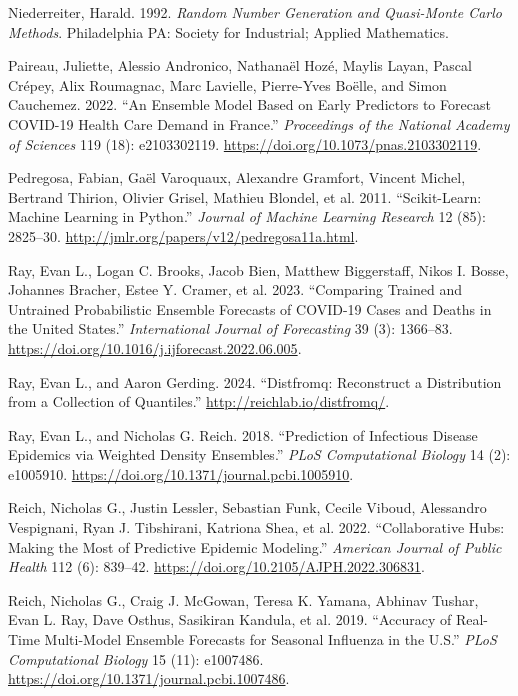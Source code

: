 \documentclass[
]{article}
\newlength{\cslhangindent}
\newenvironment{CSLReferences}[2] %
 {\begin{list}{}{%
  \setlength{\itemindent}{0pt}
  \setlength{\leftmargin}{0pt}
  \setlength{\parsep}{0pt}
  \ifodd #1
   \setlength{\leftmargin}{\cslhangindent}
   \setlength{\itemindent}{-1\cslhangindent}
  \fi
  \setlength{\itemsep}{#2\baselineskip}}}
 {\end{list}}
\begin{document}
\begin{CSLReferences}{1}{0}
Niederreiter, Harald. 1992. \emph{Random Number Generation and
Quasi-Monte Carlo Methods}. Philadelphia PA: Society for Industrial;
Applied Mathematics.

Paireau, Juliette, Alessio Andronico, Nathanaël Hozé, Maylis Layan,
Pascal Crépey, Alix Roumagnac, Marc Lavielle, Pierre-Yves Boëlle, and
Simon Cauchemez. 2022. {``An Ensemble Model Based on Early Predictors to
Forecast {COVID}-19 Health Care Demand in {France}.''} \emph{Proceedings
of the National Academy of Sciences} 119 (18): e2103302119.
\url{https://doi.org/10.1073/pnas.2103302119}.

Pedregosa, Fabian, Gaël Varoquaux, Alexandre Gramfort, Vincent Michel,
Bertrand Thirion, Olivier Grisel, Mathieu Blondel, et al. 2011.
{``Scikit-Learn: {Machine} {Learning} in {Python}.''} \emph{Journal of
Machine Learning Research} 12 (85): 2825--30.
\url{http://jmlr.org/papers/v12/pedregosa11a.html}.

Ray, Evan L., Logan C. Brooks, Jacob Bien, Matthew Biggerstaff, Nikos I.
Bosse, Johannes Bracher, Estee Y. Cramer, et al. 2023. {``Comparing
Trained and Untrained Probabilistic Ensemble Forecasts of {COVID}-19
Cases and Deaths in the {United} {States}.''} \emph{International
Journal of Forecasting} 39 (3): 1366--83.
\url{https://doi.org/10.1016/j.ijforecast.2022.06.005}.

Ray, Evan L., and Aaron Gerding. 2024. {``Distfromq: Reconstruct a
Distribution from a Collection of Quantiles.''}
\url{http://reichlab.io/distfromq/}.

Ray, Evan L., and Nicholas G. Reich. 2018. {``Prediction of Infectious
Disease Epidemics via Weighted Density Ensembles.''} \emph{PLoS
Computational Biology} 14 (2): e1005910.
\url{https://doi.org/10.1371/journal.pcbi.1005910}.

Reich, Nicholas G., Justin Lessler, Sebastian Funk, Cecile Viboud,
Alessandro Vespignani, Ryan J. Tibshirani, Katriona Shea, et al. 2022.
{``Collaborative Hubs: Making the Most of Predictive Epidemic
Modeling.''} \emph{American Journal of Public Health} 112 (6): 839--42.
\url{https://doi.org/10.2105/AJPH.2022.306831}.

Reich, Nicholas G., Craig J. McGowan, Teresa K. Yamana, Abhinav Tushar,
Evan L. Ray, Dave Osthus, Sasikiran Kandula, et al. 2019. {``Accuracy of
Real-Time Multi-Model Ensemble Forecasts for Seasonal Influenza in the
{U}.{S}.''} \emph{PLoS Computational Biology} 15 (11): e1007486.
\url{https://doi.org/10.1371/journal.pcbi.1007486}.


\end{CSLReferences}
\end{document}
